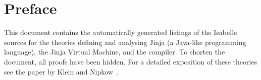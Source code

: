 \chapter{Preface}

This document contains the automatically generated listings of the
Isabelle sources for the theories defining and analysing Jinja (a
Java-like programming language), the Jinja Virtual Machine, and the
compiler. To shorten the document, all proofs have been hidden.  For a
detailed exposition of these theories see the paper by Klein and
Nipkow~\cite{KleinN04,KleinN-Toplas}.


